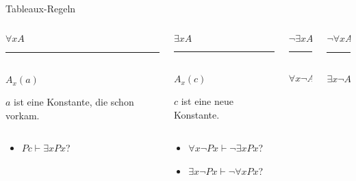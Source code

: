 \documentclass[12pt]{beamer}
\newcommand{\prule}{\vspace{-8pt}\rule{50pt}{0.5pt}}
\begin{document}
\begin{frame}{Tableaux-Regeln}
  \begin{columns}

    \begin{column}[t]{.25 \linewidth}
      \begin{center}
        $\forall x A$ \\
        \prule\\
        $A_x(a)$
      \end{center}
      $a$ ist eine Konstante, die schon vorkam.
    \end{column}
    \pause
    \begin{column}[t]{.25 \linewidth}
      \begin{center}
        $\exists x A$ \\
        \prule\\
        $A_x(c)$
      \end{center}
      $c$ ist eine neue Konstante.
    \end{column}
    \pause
    \begin{column}[t]{.25 \linewidth}
      \begin{center}
        $\neg \exists x A$\\
        \prule\\
        $\forall x \neg A$\\
      \end{center}
    \end{column}
    \pause
    \begin{column}[t]{.25 \linewidth}
      \begin{center}
        $\neg \forall x A$ \\
        \prule\\
        $\exists x \neg A$
      \end{center}
    \end{column}
  \end{columns}

  \vspace{1em}
  \begin{columns}

    \pause

    \begin{column}[t]{.5 \linewidth}
      \begin{itemize}[<+->]
      \item $Pc \vdash \exists x Px$?
      \end{itemize}
    \end{column}

    \begin{column}[t]{.5 \linewidth}
      \begin{itemize}[<+->]
      \item $\forall x \neg Px \vdash \neg \exists x Px$?
      \item $\exists x \neg Px \vdash \neg \forall x Px$?
      \end{itemize}

      \end{column}
  \end{columns}

\end{frame}
\end{document}
